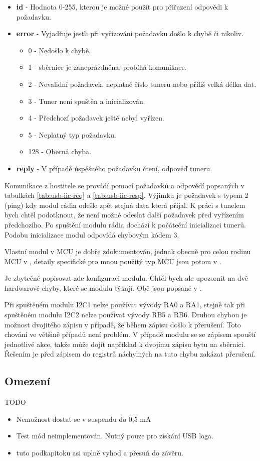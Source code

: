 \begin{itemize}
\item \textbf{id} - Hodnota 0-255, kterou je možné použít pro přiřazení odpovědi k požadavku.
\item {\textbf{error} - Vyjadřuje jestli při vyřizování požadavku došlo k chybě či nikoliv. 
	\begin{itemize}
	\item 0 - Nedošlo k chybě.
	\item 1 - \iic sběrnice je zaneprázdněna, probíhá komunikace.
	\item 2 - Nevalidní požadavek, neplatné číslo tuneru nebo příliš velká délka dat.
	\item 3 - Tuner není spuštěn a inicializován.
	\item 4 - Předchozí požadavek ještě nebyl vyřízen.
	\item 5 - Neplatný typ požadavku.
	\item 128 - Obecná chyba.
	\end{itemize}
}
\item \textbf{reply} - V případě úspěšného požadavku čtení, odpověď tuneru.
\end{itemize} 

Komunikace z hostitele se provádí pomocí požadavků a odpovědí popsaných v tabulkách \ref{tab:usb-iic-req} a \ref{tab:usb-iic-resp}. Výjimku je požadavek s typem 2 (ping) kdy modul rádia odešle zpět stejná data která přijal. K práci s tunelem bych chtěl podotknout, že není možné odeslat další požadavek před vyřízením předchozího. Po spuštění modulu rádia dochází k počáteční inicializaci tunerů. Podobu inicializace modul odpovídá chybovým kódem 3.

Vlastní modul \iic v MCU je dobře zdokumentován, jednak obecně pro celou rodinu MCU v \cite{pic-iic}, detaily specifické pro mnou použitý typ MCU jsou potom v \cite{pic}.

Je zbytečné popisovat zde konfiguraci \iic modulu. Chtěl bych ale upozornit na dvě hardwarové chyby, které se modulu týkají. Obě jsou popsané v \cite{pic-errata}.

Při spuštěném modulu I2C1 nelze používat vývody RA0 a RA1, stejně tak při spuštěném modulu I2C2 nelze používat vývody RB5 a RB6. 
Druhou chybou je možnost dvojitého zápisu v případě, že během zápisu došlo k přerušení. Toto chování ve většině případů není problém. V případě \iic modulu se se zápisem spouští jednotlivé akce, takže může dojít například k dvojímu zápisu bytu na sběrnici. Řešením je před zápisem do registrů náchylných na tuto chybu zakázat přerušení.



\subsection{Omezení}

TODO
\begin{itemize}
\item Nemožnost dostat se v suspendu do 0,5 mA
\item Test mód neimplementován. Nutný pouze pro získání USB loga.
\item tuto podkapitoku asi uplně vyhoď a přesuň do závěru.
\end{itemize}
